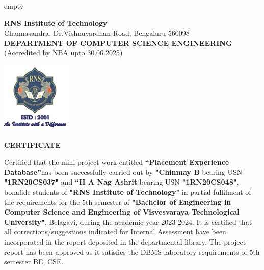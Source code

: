 
\newenvironment{certificate1}

	\clearpage\thispagestyle{empty}
	
	\begin{center}	
			\large{\textbf{RNS Institute of Technology}}\\
{\footnotesize{Channasandra, Dr.Vishnuvardhan Road, Bengaluru-560098}}\\
\textbf{DEPARTMENT OF COMPUTER SCIENCE  ENGINEERING} \\
{\footnotesize{(Accredited by NBA upto 30.06.2025)}}\\
\end{center}
	
	\begin{center}
		\includegraphics[scale=0.8]{logo.png}	
	\end{center}
	\begin{center}
		\textbf{CERTIFICATE}
	\end{center}
	
Certified that the mini project work entitled \textbf{“Placement Experience Database”}has been successfully carried out by  \textbf{"Chinmay B} bearing USN  \textbf{"1RN20CS037"} and \textbf{“H A Nag Ashrit} bearing USN  \textbf{"1RN20CS048"}, bonafide students of  \textbf{"RNS Institute of Technology"} in partial fulfilment of the requirements for the 5th semester of  \textbf{"Bachelor of Engineering in Computer Science and Engineering of Visvesvaraya Technological University"}, Belagavi, during the academic year 2023-2024. It is certified that all corrections/suggestions indicated for Internal Assessment have been incorporated in the report deposited in the departmental library. The project report has been approved as it satisfies the DBMS laboratory requirements of 5th semester BE, CSE. 	
\\
	
